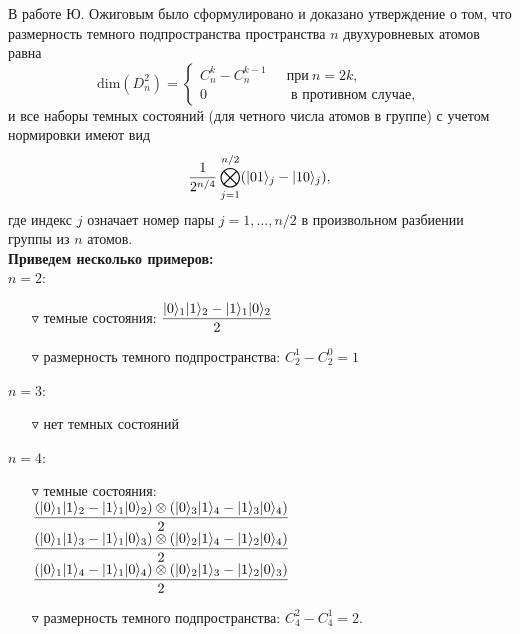 В работе \cite{dark_states_dimension} Ю. Ожиговым было сформулировано и доказано утверждение о том, что размерность темного подпространства пространства $n$ двухуровневых атомов равна
\begin{equation}\label{dim_d_2_n}
	\text{dim}(D_{n}^2) =	
	\begin{cases}
		C_{n}^{k} - C_{n}^{k-1}\quad~~\text{при}~n = 2k, \\
		0 \qquad\qquad\qquad\text{в противном случае},
	\end{cases}
\end{equation}
и все наборы темных состояний (для четного числа атомов в группе) с учетом нормировки имеют вид 
\begin{equation}\label{d_2_n}
	\frac{1}{2^{n/4}}\bigotimes_{j=1}^{n/2}(|01\rangle_{j}-|10\rangle_{j}),
\end{equation}
где индекс $j$ означает номер пары $j = 1,\dots, n/2$ в произвольном разбиении группы из $n$ атомов.
\\[24pt]
\textbf{Приведем несколько примеров:}\\[0pt]

\noindent
$n = 2$:
\begin{itemize}
	\item[$\triangledown$]{темные состояния: $\displaystyle \frac{|0\rangle_{1}|1\rangle_{2} - |1\rangle_{1}|0\rangle_{2}}{2}$}\\[6pt]
	\item[$\triangledown$]{размерность темного подпространства: $C_{2}^{1} - C_{2}^{0} = 1$\\}
\end{itemize}
$n = 3$:
\begin{itemize}
	\item[$\triangledown$]{нет темных состояний\\}
\end{itemize}
$n = 4$:
\begin{itemize}
	\item[$\triangledown$]{
		темные состояния:\\[12pt]
		$\displaystyle \frac{(|0\rangle_{1}|1\rangle_{2} - |1\rangle_{1}|0\rangle_{2})\otimes(|0\rangle_{3}|1\rangle_{4} - |1\rangle_{3}|0\rangle_{4})}{2}$\\[12pt]
		$\displaystyle \frac{(|0\rangle_{1}|1\rangle_{3} - |1\rangle_{1}|0\rangle_{3})\otimes(|0\rangle_{2}|1\rangle_{4} - |1\rangle_{2}|0\rangle_{4})}{2}$\\[12pt]
		$\displaystyle \frac{(|0\rangle_{1}|1\rangle_{4} - |1\rangle_{1}|0\rangle_{4})\otimes(|0\rangle_{2}|1\rangle_{3} - |1\rangle_{2}|0\rangle_{3})}{2}$\\[12pt]
	}
	\item[$\triangledown$]{размерность темного подпространства: $C_{4}^{2} - C_{4}^{1} = 2$.}
\end{itemize}

